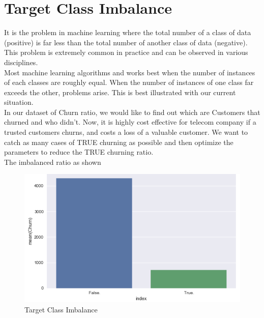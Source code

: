 \documentclass[a4paper,12pt]{report}
\begin{document}
\section{Target Class Imbalance}
It is the problem in machine learning where the total number of a class of data (positive) is far less than the total number of another class of data (negative). This problem is extremely common in practice and can be observed in various disciplines.\\
Most machine learning algorithms and works best when the number of instances of each classes are roughly equal. When the number of instances of one class far exceeds the other, problems arise. This is best illustrated with our current situation.\\
In our dataset of Churn ratio, we would like to find out which are Customers that churned and who didn't. Now, it is highly cost effective for telecom company if a trusted customers churns, and costs a loss of a valuable customer. We want to catch as many cases of TRUE churning as possible and then optimize the parameters to reduce the TRUE churning ratio.\\
The imbalanced ratio as shown 
\begin{figure}[h]
\vspace{5pt}
\centering
\includegraphics[scale = 0.7]{Target_imb.PNG}
\caption{Target Class Imbalance}
\label{fig:3.4}
\end{figure}
\FloatBarrier
\end{document}
